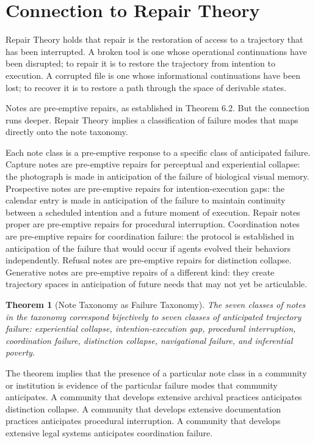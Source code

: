 \documentclass[12pt, a4paper]{article}
\theoremstyle{plain}
\newtheorem{theorem}{Theorem}[section]
\theoremstyle{definition}
\theoremstyle{remark}
\begin{document}
\section{Connection to Repair Theory}

Repair Theory holds that repair is the restoration of access to a trajectory that
has been interrupted. A broken tool is one whose operational continuations have
been disrupted; to repair it is to restore the trajectory from intention to
execution. A corrupted file is one whose informational continuations have been
lost; to recover it is to restore a path through the space of derivable states.

Notes are pre-emptive repairs, as established in Theorem 6.2. But the connection
runs deeper. Repair Theory implies a classification of failure modes that maps
directly onto the note taxonomy.

Each note class is a pre-emptive response to a specific class of anticipated
failure. Capture notes are pre-emptive repairs for perceptual and experiential
collapse: the photograph is made in anticipation of the failure of biological
visual memory. Prospective notes are pre-emptive repairs for intention-execution
gaps: the calendar entry is made in anticipation of the failure to maintain
continuity between a scheduled intention and a future moment of execution. Repair
notes proper are pre-emptive repairs for procedural interruption. Coordination
notes are pre-emptive repairs for coordination failure: the protocol is established
in anticipation of the failure that would occur if agents evolved their behaviors
independently. Refusal notes are pre-emptive repairs for distinction collapse.
Generative notes are pre-emptive repairs of a different kind: they create
trajectory spaces in anticipation of future needs that may not yet be articulable.

\begin{theorem}[Note Taxonomy as Failure Taxonomy]
The seven classes of notes in the taxonomy correspond bijectively to seven classes
of anticipated trajectory failure: experiential collapse, intention-execution gap,
procedural interruption, coordination failure, distinction collapse, navigational
failure, and inferential poverty.
\end{theorem}

The theorem implies that the presence of a particular note class in a community
or institution is evidence of the particular failure modes that community
anticipates. A community that develops extensive archival practices anticipates
distinction collapse. A community that develops extensive documentation practices
anticipates procedural interruption. A community that develops extensive legal
systems anticipates coordination failure.
\end{document}

